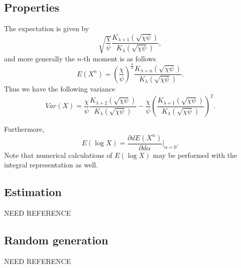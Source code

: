 \subsection{Properties}
The expectation is given by 
$$
\sqrt{\frac{\chi}{\psi}}
  \frac{K_{\lambda+1}(\sqrt{\chi\psi})}{K_{\lambda}(\sqrt{\chi\psi})},
$$ and more generally the $n$-th moment is as follows
$$
  E(X^n) = \left(\frac{\chi}{\psi}\right)^\frac{n}{2}
  \frac{K_{\lambda+n}(\sqrt{\chi\psi})}{K_\lambda(\sqrt{\chi\psi})}.
$$
Thus we have the following variance
$$
Var(X) = \frac{\chi}{\psi}
  \frac{K_{\lambda+2}(\sqrt{\chi\psi})}{K_\lambda(\sqrt{\chi\psi})} - \frac{\chi}{\psi}
  \left(\frac{K_{\lambda+1}(\sqrt{\chi\psi})}{K_\lambda(\sqrt{\chi\psi})}\right)^2.
$$


Furthermore,
\begin{equation}\label{eq:eloggig}
  E(\log X) =  \frac{\partial d E(X^\alpha)}{\partial d \alpha}\biggr|_{\alpha=0}.
\end{equation}
Note that numerical calculations of $E(\log X)$ may be performed
with the integral representation as well.



\subsection{Estimation}
NEED REFERENCE

\subsection{Random generation}
NEED REFERENCE


